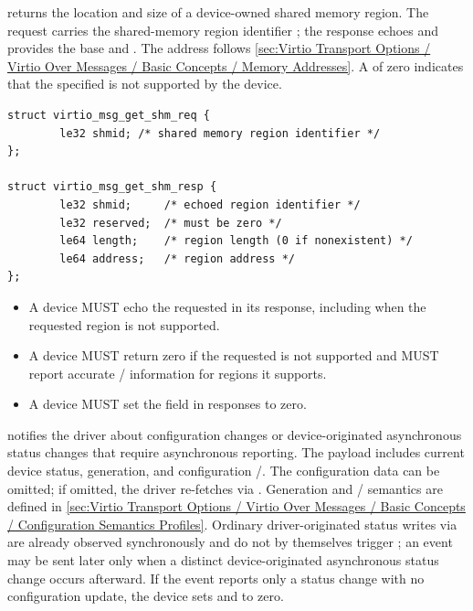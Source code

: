 
 returns the location and size of a device-owned shared memory
region. The request carries the shared-memory region identifier
; the response echoes  and provides the base
 and . The address follows
\ref{sec:Virtio Transport Options / Virtio Over Messages / Basic Concepts / Memory Addresses}.
A  of zero
indicates that the specified  is not supported by the device.

\begin{lstlisting}
struct virtio_msg_get_shm_req {
        le32 shmid; /* shared memory region identifier */
};

struct virtio_msg_get_shm_resp {
        le32 shmid;     /* echoed region identifier */
        le32 reserved;  /* must be zero */
        le64 length;    /* region length (0 if nonexistent) */
        le64 address;   /* region address */
};
\end{lstlisting}

\begin{itemize}
  \item A device MUST echo the requested  in its response,
        including when the requested region is not supported.
  \item A device MUST return zero  if the requested
         is not supported and MUST report accurate
        / information for regions it supports.
  \item A device MUST set the  field in 
        responses to zero.
\end{itemize}


 notifies the driver about configuration changes or
device-originated asynchronous status changes that require asynchronous
reporting. The payload includes current device status, generation, and
configuration /. The configuration data can be
omitted; if omitted, the driver re-fetches via . Generation
and / semantics are defined in
\ref{sec:Virtio Transport Options / Virtio Over Messages / Basic Concepts / Configuration Semantics Profiles}.
Ordinary driver-originated status writes via  are
already observed synchronously and do not by themselves trigger
; an event may be sent later only when a distinct
device-originated asynchronous status change occurs afterward.
If the event reports only a status change with no configuration update, the
device sets  and  to zero.

